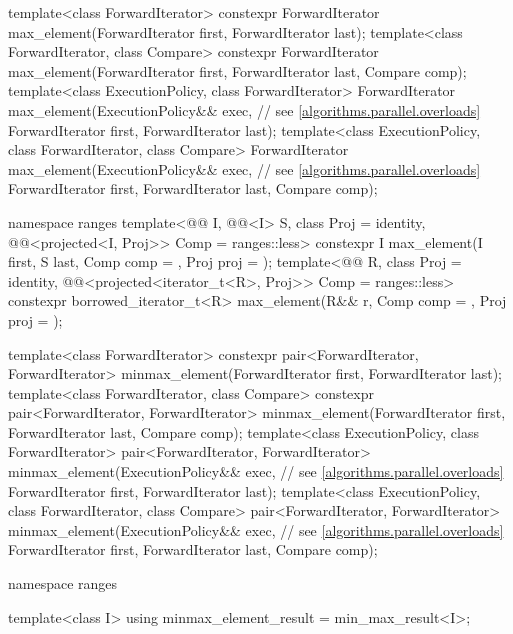 \begin{codeblock}
{  template<class ForwardIterator>
    constexpr ForwardIterator max_element(ForwardIterator first, ForwardIterator last);
  template<class ForwardIterator, class Compare>
    constexpr ForwardIterator max_element(ForwardIterator first, ForwardIterator last,
                                          Compare comp);
  template<class ExecutionPolicy, class ForwardIterator>
    ForwardIterator max_element(ExecutionPolicy&& exec,         // see \ref{algorithms.parallel.overloads}
                                ForwardIterator first, ForwardIterator last);
  template<class ExecutionPolicy, class ForwardIterator, class Compare>
    ForwardIterator max_element(ExecutionPolicy&& exec,         // see \ref{algorithms.parallel.overloads}
                                ForwardIterator first, ForwardIterator last,
                                Compare comp);

  namespace ranges {
    template<@@ I, @@<I> S, class Proj = identity,
             @@<projected<I, Proj>> Comp = ranges::less>
      constexpr I max_element(I first, S last, Comp comp = {}, Proj proj = {});
    template<@@ R, class Proj = identity,
             @@<projected<iterator_t<R>, Proj>> Comp = ranges::less>
      constexpr borrowed_iterator_t<R>
        max_element(R&& r, Comp comp = {}, Proj proj = {});
  }

  template<class ForwardIterator>
    constexpr pair<ForwardIterator, ForwardIterator>
      minmax_element(ForwardIterator first, ForwardIterator last);
  template<class ForwardIterator, class Compare>
    constexpr pair<ForwardIterator, ForwardIterator>
      minmax_element(ForwardIterator first, ForwardIterator last, Compare comp);
  template<class ExecutionPolicy, class ForwardIterator>
    pair<ForwardIterator, ForwardIterator>
      minmax_element(ExecutionPolicy&& exec,                    // see \ref{algorithms.parallel.overloads}
                     ForwardIterator first, ForwardIterator last);
  template<class ExecutionPolicy, class ForwardIterator, class Compare>
    pair<ForwardIterator, ForwardIterator>
      minmax_element(ExecutionPolicy&& exec,                    // see \ref{algorithms.parallel.overloads}
                     ForwardIterator first, ForwardIterator last, Compare comp);

  namespace ranges {
    template<class I>
      using minmax_element_result = min_max_result<I>;

}}
\end{codeblock}
